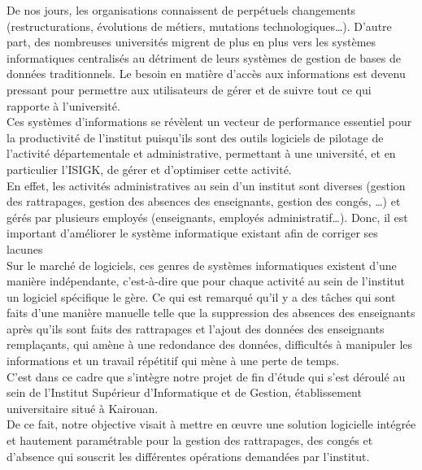 \documentclass[12 pt ]{report}
\begin{document}
 De nos jours, les organisations connaissent de perpétuels changements (restructurations, évolutions de métiers, mutations technologiques…). D’autre part, des nombreuses universités migrent de plus en plus vers les systèmes informatiques centralisés au détriment de leurs systèmes de gestion de bases de données traditionnels. Le besoin en matière d’accès aux informations est devenu pressant pour permettre aux utilisateurs de gérer et de suivre tout ce qui rapporte à l’université.
\\

Ces systèmes d’informations se révèlent un vecteur de performance essentiel pour la productivité de l’institut puisqu’ils sont des outils logiciels de pilotage de l’activité départementale et administrative, permettant à une université, et en particulier l’ISIGK, de gérer et d’optimiser cette activité.
\\

En effet, les activités administratives au sein d’un institut sont diverses (gestion des rattrapages, gestion des absences des enseignants, gestion des congés, …) et gérés par plusieurs employés (enseignants, employés administratif…). Donc, il est important d’améliorer le système informatique existant afin de corriger ses lacunes
\\

Sur le marché de logiciels, ces genres de systèmes informatiques existent d’une manière indépendante, c'est-à-dire que pour chaque activité au sein de l’institut un logiciel spécifique le gère. Ce qui est remarqué qu’il y a des tâches qui sont faits d’une manière manuelle telle que la suppression des absences des enseignants après qu’ils sont faits des rattrapages et l’ajout des données des enseignants remplaçants, qui amène à une redondance des données, difficultés à manipuler les informations et un travail répétitif qui mène à une perte de temps.
 \\
C’est dans ce cadre que s’intègre notre projet de fin d’étude qui s’est déroulé au sein de l’Institut Supérieur d’Informatique et de Gestion, établissement universitaire situé à Kairouan.
\\

De ce fait, notre objective visait à mettre en œuvre une solution logicielle intégrée et hautement paramétrable pour la gestion des rattrapages, des congés et d’absence qui souscrit les différentes opérations demandées par l’institut.
\\
\end{document}
